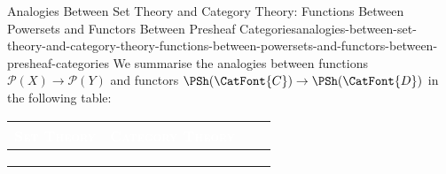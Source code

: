 \begin{remark}{Analogies Between Set Theory and Category Theory: Functions Between Powersets and Functors Between Presheaf Categories}{analogies-between-set-theory-and-category-theory-functions-between-powersets-and-functors-between-presheaf-categories}%
    We summarise the analogies between functions $\mathcal{P}(X)\to\mathcal{P}(Y)$ and functors $\PSh(\CatFont{C})\to\PSh(\CatFont{D})$ in the following table:
    \begingroup%
    \setlength\cellspacetoplimit{3pt}
    \setlength\cellspacebottomlimit{3pt}
    \renewcommand{\arraystretch}{1.2}
    \begin{center}
        \begin{tabular}{|Sc|Sc|}\hline{}
            \textcolor{white}{\textbf{\textsc{Set Theory}}}                                                   & \textcolor{white}{\textbf{\textsc{Category Theory}}}                                                                                \\\hline{}
               &                      \\
             &                        \\
             &  \\\hline
        \end{tabular}
    \end{center}
    \endgroup
\end{remark}
